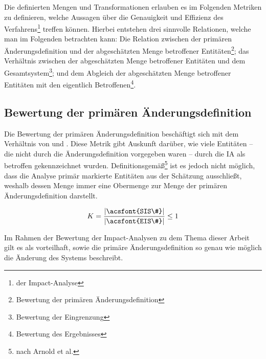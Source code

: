     \pagebreak
    \noindent
    Die definierten Mengen und Transformationen erlauben es im Folgenden Metriken zu definieren, welche Aussagen über die Genauigkeit und Effizienz des Verfahrens\footnote{der Impact-Analyse} treffen können.
    Hierbei entstehen drei sinnvolle Relationen, welche man im Folgenden betrachten kann:
    Die Relation zwischen der primären Änderungsdefinition und der abgeschätzten Menge betroffener Entitäten\footnote{Bewertung der primären Änderungsdefinition}; das Verhältnis zwischen der abgeschätzten Menge betroffener Entitäten und dem Gesamtsystem\footnote{Bewertung der Eingrenzung}; und dem Abgleich der abgeschätzten Menge betroffener Entitäten mit den eigentlich Betroffenen\footnote{Bewertung des Ergebnisses}.

    
\subsection{Bewertung der primären Änderungsdefinition}
    
    Die Bewertung der primären Änderungsdefinition beschäftigt sich mit dem Verhältnis von  und . 
    Diese Metrik gibt Auskunft darüber, wie viele Entitäten -- die nicht durch die Änderungsdefinition vorgegeben waren -- durch die \ac{IA} als betroffen gekennzeichnet wurden.
    Definitionsgemäß\footnote{nach Arnold et al.} ist es jedoch nicht möglich, dass die Analyse primär markierte Entitäten aus der Schätzung ausschließt, weshalb dessen Menge immer eine Obermenge zur Menge der primären Änderungsdefinition darstellt.
    
    $$
        K = \dfrac{|\text{\acsfont{SIS\#}}|}{|\text{\acsfont{EIS\#}}|} \leq 1
    $$
    
    Im Rahmen der Bewertung der Impact-Analysen zu dem Thema dieser Arbeit gilt es als vorteilhaft, sowie die primäre Änderungsdefinition so genau wie möglich die Änderung des Systems beschreibt. 
    
    
    

